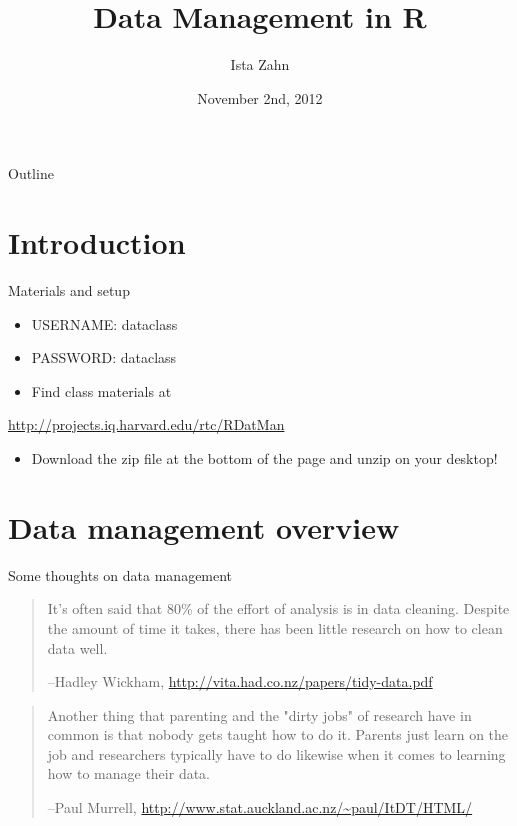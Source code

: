 \documentclass[table,smaller]{beamer}
\institute{Harvard MIT Data Center}
\author{Ista Zahn}
\date{November 2nd, 2012}
\title{Data Management in R}
\begin{document}
\maketitle
\begin{frame}{Outline}
\tableofcontents
\end{frame}


\section{Introduction}
\label{sec-1}

\begin{frame}[label=sec-1-1]{Materials and setup}
\begin{itemize}
\item USERNAME: dataclass
\item PASSWORD: dataclass

\item Find class materials at
\end{itemize}
\url{http://projects.iq.harvard.edu/rtc/RDatMan}

\begin{itemize}
\item \alert{Download the zip file at the bottom of the page and unzip on your desktop!}
\end{itemize}
\end{frame}

\section{Data management overview}
\label{sec-2}
\begin{frame}[label=sec-2-1]{Some thoughts on data management}
\begin{quote}
It's often said that 80\% of the effort of analysis is in data cleaning. Despite the amount of time it takes, there has been little research on how to clean data well.

--Hadley Wickham, \url{http://vita.had.co.nz/papers/tidy-data.pdf}
\end{quote}

\begin{quote}
Another thing that parenting and the "dirty jobs" of research have in common is that nobody gets taught how to do it. Parents just learn on the job and researchers typically have to do likewise when it comes to learning how to manage their data.

--Paul Murrell, \url{http://www.stat.auckland.ac.nz/~paul/ItDT/HTML/}
\end{quote}
\end{frame}
\end{document}
